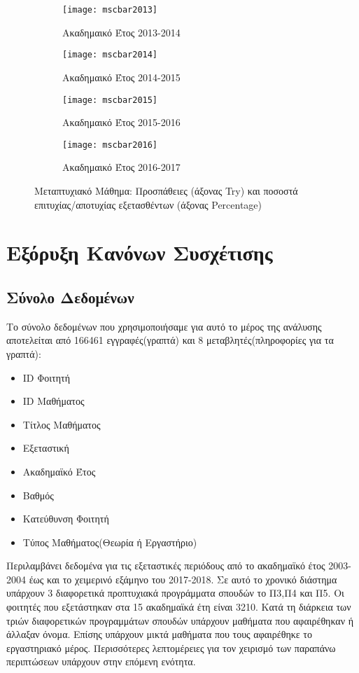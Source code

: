 \documentclass[12pt,a4paper,final]{article}
\begin{document}
\begin{figure}[h]
	\centering
	\begin{subfigure}[b]{0.475\textwidth}
		\centering 
		\texttt{[image: mscbar2013]}
		\caption{Ακαδημαικό Έτος 2013-2014}
		\label{fig:mscbar2013}
	\end{subfigure}
	\hfill
	\begin{subfigure}[b]{0.475\textwidth}
		\centering 
		\texttt{[image: mscbar2014]}
		\caption{Ακαδημαικό Έτος 2014-2015}
		\label{fig:mscbar2014}
	\end{subfigure}
	
	\begin{subfigure}[b]{0.475\textwidth}
		\centering 
		\texttt{[image: mscbar2015]}
		\caption{Ακαδημαικό Έτος 2015-2016}
		\label{fig:mscbar2015}
	\end{subfigure}
	\hfill
	\begin{subfigure}[b]{0.475\textwidth}
		\centering 
		\texttt{[image: mscbar2016]}
		\caption{Ακαδημαικό Έτος 2016-2017}
		\label{fig:mscbar2016}
	\end{subfigure}
	\caption{Μεταπτυχιακό Μάθημα: Προσπάθειες (άξονας \foreignlanguage{english}{Try}) και ποσοστά επιτυχίας/αποτυχίας εξετασθέντων (άξονας \foreignlanguage{english}{Percentage})}	
	\label{fig:mscdensBar}
\end{figure}

\clearpage
\section{Εξόρυξη Κανόνων Συσχέτισης}
\subsection{Σύνολο Δεδομένων}
Το σύνολο δεδομένων που χρησιμοποιήσαμε για αυτό το μέρος της ανάλυσης αποτελείται από 166461 εγγραφές(γραπτά) και 8 μεταβλητές(πληροφορίες για τα γραπτά):
\begin{itemize}
\item \foreignlanguage{english}{ID} Φοιτητή
\item \foreignlanguage{english}{ID} Μαθήματος
\item Τίτλος Μαθήματος
\item Εξεταστική 
\item Ακαδημαϊκό Έτος
\item Βαθμός 
\item Κατεύθυνση Φοιτητή
\item Τύπος Μαθήματος(Θεωρία ή Εργαστήριο)
\end{itemize}
Περιλαμβάνει δεδομένα για τις εξεταστικές περιόδους  από το ακαδημαϊκό έτος 2003-2004 έως και το χειμερινό εξάμηνο του 2017-2018. Σε αυτό το χρονικό  διάστημα  υπάρχουν 3 διαφορετικά προπτυχιακά προγράμματα σπουδών το Π3,Π4 και Π5. Οι φοιτητές  που εξετάστηκαν στα 15 ακαδημαϊκά έτη είναι 3210. Κατά τη διάρκεια των τριών διαφορετικών προγραμμάτων σπουδών υπάρχουν μαθήματα που αφαιρέθηκαν ή άλλαξαν όνομα. Επίσης υπάρχουν μικτά μαθήματα που τους αφαιρέθηκε το εργαστηριακό μέρος. Περισσότερες  λεπτομέρειες για τον  χειρισμό των  παραπάνω περιπτώσεων  υπάρχουν στην επόμενη ενότητα.
\end{document}
